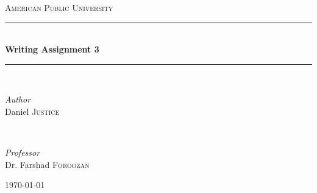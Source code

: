 \documentclass[11pt]{article}
\begin{document}

\begin{titlepage} %
	\newcommand{\HRule}{\rule{\linewidth}{0.5mm}} %

	\center %


	\textsc{\LARGE American Public University}\\[1.5cm] %


	\HRule\\[0.4cm]

	{\huge\bfseries Writing Assignment 3}\\[0.4cm] %

	\HRule\\[1.5cm]


	\begin{minipage}{0.4\textwidth}
		\begin{flushleft}
			\large
			\textit{Author}\\
			Daniel \textsc{Justice} %
		\end{flushleft}
	\end{minipage}
	~
	\begin{minipage}{0.4\textwidth}
		\begin{flushright}
			\large
			\textit{Professor}\\
			Dr. Farshad \textsc{Foroozan} %
		\end{flushright}
	\end{minipage}


	\vfill\vfill\vfill
	{\large\today} %
	\vfill

\end{titlepage}
\end{document}
